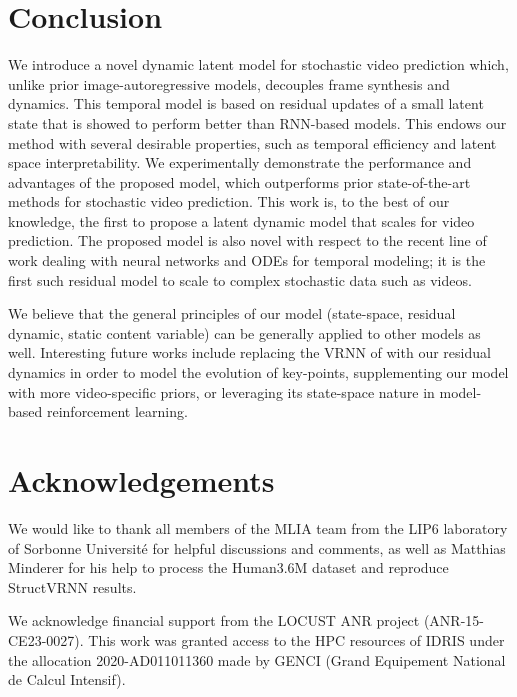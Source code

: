 \documentclass{article}
\begin{document}
\section{Conclusion}

We introduce a novel dynamic latent model for stochastic video prediction which, unlike prior image-autoregressive models, decouples frame synthesis and dynamics.
This temporal model is based on residual updates of a small latent state that is showed to perform better than RNN-based models.
This endows our method with several desirable properties, such as temporal efficiency and latent space interpretability.
We experimentally demonstrate the performance and advantages of the proposed model, which outperforms prior state-of-the-art methods for stochastic video prediction.
This work is, to the best of our knowledge, the first to propose a latent dynamic model that scales for video prediction.
The proposed model is also novel with respect to the recent line of work dealing with neural networks and ODEs for temporal modeling; it is the first such residual model to scale to complex stochastic data such as videos.

We believe that the general principles of our model (state-space, residual dynamic, static content variable) can be generally applied to other models as well.
Interesting future works include replacing the VRNN of \citet{Minderer2019} with our residual dynamics in order to model the evolution of key-points, supplementing our model with more video-specific priors, or leveraging its state-space nature in model-based reinforcement learning.


\section*{Acknowledgements}

We would like to thank all members of the MLIA team from the LIP6 laboratory of Sorbonne Université for helpful discussions and comments, as well as Matthias Minderer for his help to process the Human3.6M dataset and reproduce StructVRNN results.

We acknowledge financial support from the LOCUST ANR project (ANR-15-CE23-0027).
This work was granted access to the HPC resources of IDRIS under the allocation 2020-AD011011360 made by GENCI (Grand Equipement National de Calcul Intensif). 





\onecolumn
\end{document}

